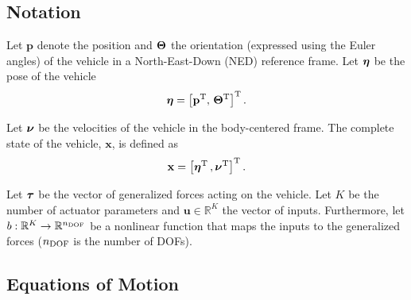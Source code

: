 \subsection{Notation}
\label{sec:ccta_notation}

Let $\mathbf{p}$ denote the position and $\bm{\Theta}$ the orientation (expressed using the Euler angles) of the vehicle in a North-East-Down (NED) reference frame.
%
Let $\bm{\eta}$ be the pose of the vehicle
\begin{equation}
    \bm{\eta} = \left[ \mathbf{p}^{\rm T} ,\, \bm{\Theta}^{\rm T} \right]^{\rm T}.
\end{equation}

Let $\bm{\nu}$ be the velocities of the vehicle in the body-centered frame.
%
The complete state of the vehicle, $\mathbf{x}$, is defined as
\begin{equation}
    \mathbf{x} = \left[ \bm{\eta}^{\rm T} \,, \bm{\nu}^{\rm T} \right]^{\rm T}.
\end{equation}

Let $\bm{\tau}$ be the vector of generalized forces acting on the vehicle.
Let $K$ be the number of actuator parameters and $\mathbf{u} \in \mathbb{R}^{K}$ the vector of inputs.
Furthermore, let $b : \mathbb{R}^{K} \rightarrow \mathbb{R}^{n_{\rm DOF}}$ be a nonlinear function that maps the inputs to the generalized forces ($n_{\rm DOF}$ is the number of DOFs).

\subsection{Equations of Motion}

